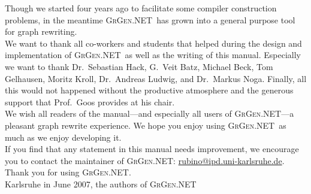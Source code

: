 \documentclass[a4paper,final,11pt]{book}
\providecommand{\GrG}{{\scshape GrGen.NET}}
\newcounter{example}
\begin{document}
Though we started four years ago to facilitate some compiler construction problems, in the meantime \GrG\ has grown into a general purpose tool for graph rewriting.\\[3ex]

We want to thank all co-workers and students that helped during the design and implementation of \GrG\ as well as the writing of this manual.
Especially we want to thank Dr.~Sebastian Hack, G.~Veit Batz, Michael Beck, Tom Gelhausen, Moritz Kroll, Dr.~Andreas Ludwig, and Dr.~Markus Noga.
Finally, all this would not happened without the productive atmosphere and the generous support that Prof.~Goos provides at his chair.\\[3ex]

We wish all readers of the manual---and especially all users of \GrG---a pleasant graph rewrite experience.
We hope you enjoy using \GrG\ as much as we enjoy developing it.\\[3ex]

If you find that any statement in this manual needs improvement, we encourage you to contact the maintainer of \GrG: \url{rubino@ipd.uni-karlsruhe.de}.
Thank you for using \GrG.\\[6ex]

\noindent Karlsruhe in June 2007, the authors of \GrG\\


\clearpage

\tableofcontents

















\printindex
\end{document}

